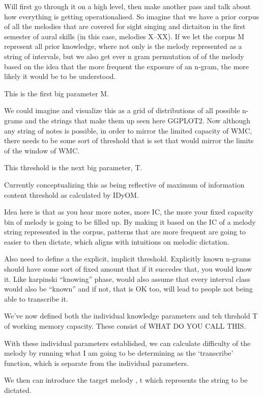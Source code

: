 \documentclass[]{book}
\theoremstyle{definition}
\theoremstyle{definition}
\theoremstyle{definition}
\theoremstyle{remark}
\begin{document}
Will first go through it on a high level, then make another pass and
talk about how everything is getting operationalised. So imagine that we
have a prior corpus of all the melodies that are covered for sight
singing and dictaiton in the first semester of aural skills (in this
case, melodies X--XX). If we let the corpus M represent all prior
knowledge, where not only is the melody represented as a string of
intervals, but we also get ever n gram permutation of of the melody
based on the idea that the more frequent the exposure of an n-gram, the
more likely it would be to be understood.

This is the first big parameter M.

We could imagine and visualize this as a grid of distributions of all
possible n-grams and the strings that make them up seen here GGPLOT2.
Now although any string of notes is possible, in order to mirror the
limited capacity of WMC, there needs to be some sort of threshold that
is set that would mirror the limits of the window of WMC.

This threshold is the next big parameter, T.

Currently conceptualizing this as being reflective of maximum of
information content threshold as calculated by IDyOM.

Idea here is that as you hear more notes, more IC, the more your fixed
capacity bin of melody is going to be filled up. By making it based on
the IC of a melody string represented in the corpus, patterns that are
more frequent are going to easier to then dictate, which aligns with
intuitions on melodic dictation.

Also need to define a the explicit, implicit threshold. Explicitly known
n-grams should have some sort of fixed amount that if it succedes that,
you would know it. Like karpinski ``knowing'' phase, would also assume
that every interval class would also be ``known'' and if not, that is OK
too, will lead to people not being able to transcribe it.

We've now defined both the individual knowledge parameters and teh
thrshold T of working memory capacity. These consist of WHAT DO YOU CALL
THIS.

With these individual parameters established, we can calculate
difficulty of the melody by running what I am going to be determining as
the `transcribe' function, which is separate from the individual
parameters.

We then can introduce the target melody , t which represents the string
to be dictated.
\end{document}
